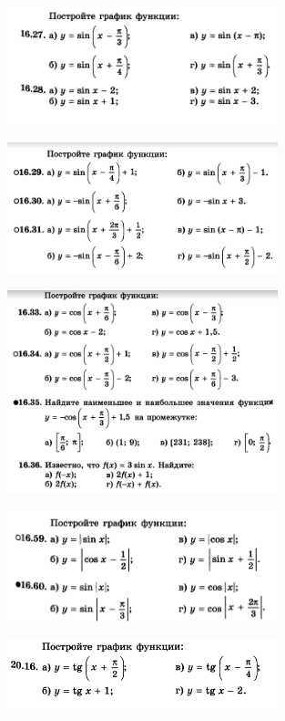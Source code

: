 
\begin{figure}[h!]
	\centering
	\includegraphics[width=0.7\textwidth]{img/sin_t1.png}
\end{figure}

\begin{figure}[h!]
	\centering
	\includegraphics[width=0.7\textwidth]{img/sin_t2.png}
\end{figure}

\begin{figure}[h!]
	\centering
	\includegraphics[width=0.7\textwidth]{img/cos_t1.png}
\end{figure}

\begin{figure}[h!]
	\centering
	\includegraphics[width=0.7\textwidth]{img/cos_t2.png}
\end{figure}
\newpage
\begin{figure}[h!]
	\centering
	\includegraphics[width=0.7\textwidth]{img/tg_t1.png}
\end{figure}

